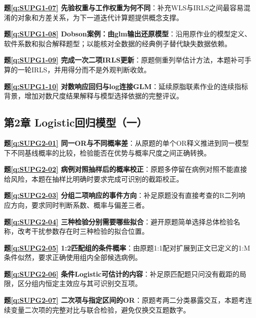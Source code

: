 \noindent\textbf{题\ref*{q:SUPG1-07} 先验权重与工作权重为何不同}：补充WLS与IRLS之间最容易混淆的对象和方差关系，为下一道迭代计算题提供概念支撑。\par

\noindent\textbf{题\ref*{q:SUPG1-08} Dobson案例：由glm输出还原模型}：沿用原作业的模型定义、软件系数和拟合解释题型；以能核对全数据的经典例子替代缺失数据依赖。\par

\noindent\textbf{题\ref*{q:SUPG1-09} 完成一次二项IRLS更新}：原题侧重列举估计方法，本题补可手算的一轮IRLS，并用得分而不是外观判断收敛。\par

\noindent\textbf{题\ref*{q:SUPG1-10} 对数响应回归与log连接GLM}：延续原脂联素作业的连续指标背景，增加对数尺度结果解释与模型选择依据的完整评议。\par

\subsection*{第2章 Logistic回归模型（一）}

\noindent\textbf{题\ref*{q:SUPG2-01} 同一OR与不同概率差}：从原题的单个OR释义推进到同一模型下不同基线概率的比较，检验能否在优势与概率尺度之间正确转换。\par

\noindent\textbf{题\ref*{q:SUPG2-02} 病例对照抽样后的概率校正}：原题多停留在病例对照不能直接给风险，本题在抽样比明确时要求完成可识别的截距校正。\par

\noindent\textbf{题\ref*{q:SUPG2-03} 分组二项响应的事件方向}：补足原题没有直接考查的R二列响应方向，要求同时判断系数、概率与偏差三者。\par

\noindent\textbf{题\ref*{q:SUPG2-04} 三种检验分别需要哪些拟合}：避开原题简单选择总体检验名称，改考干扰参数存在时三种检验的拟合位置。\par

\noindent\textbf{题\ref*{q:SUPG2-05} 1:2匹配组的条件概率}：由原题1:1配对扩展到正文已定义的1:M条件似然，要求正确使用组内全部候选病例。\par

\noindent\textbf{题\ref*{q:SUPG2-06} 条件Logistic可估计的内容}：补足原匹配题只问没有截距的局限，区分组内恒定主效应与其可识别交互项。\par

\noindent\textbf{题\ref*{q:SUPG2-07} 二次项与指定区间的OR}：原题考两二分类暴露交互，本题考连续变量二次项的完整对比与联合检验，避免仅换交互题数字。\par


